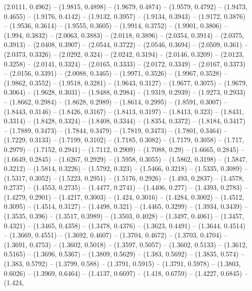 {  (2.0111, 0.4962) -- (1.9815, 0.4898) -- (1.9679, 0.4874) -- (1.9579, 0.4792) 
  -- (1.9473, 0.4655) -- (1.9176, 0.4142) -- (1.9132, 0.3957) -- (1.9134, 
  0.3943) -- (1.9172, 0.3876) -- (1.9536, 0.3614) -- (1.9555, 0.3605) -- 
  (1.9914, 0.3752) -- (1.9901, 0.3806) -- (1.994, 0.3832) -- (2.0063, 0.3883) --
   (2.0118, 0.3896) -- (2.0354, 0.3914) -- (2.0375, 0.3913) -- (2.0408, 0.3907) 
  -- (2.0544, 0.3722) -- (2.0546, 0.3694) -- (2.0509, 0.361) -- (2.0373, 0.3326)
   -- (2.0292, 0.324) -- (2.0242, 0.3194) -- (2.0146, 0.3209) -- (2.0123, 
  0.3258) -- (2.0141, 0.3324) -- (2.0165, 0.3333) -- (2.0172, 0.3349) -- 
  (2.0167, 0.3373) -- (2.0156, 0.3391) -- (2.0088, 0.3465) -- (1.9971, 0.3526) 
  -- (1.9967, 0.3528) -- (1.9862, 0.3552) -- (1.9518, 0.3281) -- (1.9643, 
  0.3127) -- (1.9677, 0.3075) -- (1.9679, 0.3064) -- (1.9628, 0.3031) -- 
  (1.9488, 0.2984) -- (1.9319, 0.2939) -- (1.9273, 0.2933) -- (1.8662, 0.2984) 
  -- (1.8628, 0.2989) -- (1.8614, 0.2995) -- (1.8591, 0.3007) -- (1.8443, 
  0.3146) -- (1.8426, 0.3167) -- (1.8413, 0.3197) -- (1.8413, 0.323) -- (1.8431,
   0.3314) -- (1.8428, 0.3324) -- (1.8408, 0.3344) -- (1.8354, 0.3372) -- 
  (1.8184, 0.3417) -- (1.7889, 0.3473) -- (1.7844, 0.3479) -- (1.7819, 0.3473) 
  -- (1.7801, 0.3464) -- (1.7229, 0.3133) -- (1.7199, 0.3102) -- (1.7185, 
  0.3082) -- (1.7179, 0.3058) -- (1.717, 0.2979) -- (1.7152, 0.2941) -- (1.7112,
   0.2909) -- (1.7088, 0.29) -- (1.6665, 0.2845) -- (1.6649, 0.2845) -- (1.6267,
   0.2929) -- (1.5958, 0.3055) -- (1.5862, 0.3198) -- (1.5847, 0.3212) -- 
  (1.5814, 0.3226) -- (1.5792, 0.323) -- (1.5466, 0.3218) -- (1.5335, 0.3089) --
   (1.5317, 0.3052) -- (1.5223, 0.2951) -- (1.5176, 0.2926) -- (1.493, 0.2837) 
  -- (1.4578, 0.2737) -- (1.4553, 0.2735) -- (1.4477, 0.2741) -- (1.4406, 0.277)
   -- (1.4393, 0.2783) -- (1.4279, 0.2901) -- (1.4217, 0.3003) -- (1.424, 
  0.3016) -- (1.4284, 0.3002) -- (1.4512, 0.3095) -- (1.4514, 0.3127) -- 
  (1.4498, 0.321) -- (1.4465, 0.3299) -- (1.3934, 0.3439) -- (1.3535, 0.396) -- 
  (1.3517, 0.3989) -- (1.3503, 0.4028) -- (1.3497, 0.4061) -- (1.3457, 0.4321) 
  -- (1.3465, 0.4358) -- (1.3478, 0.4376) -- (1.3623, 0.4491) -- (1.3644, 
  0.4514) -- (1.3669, 0.4551) -- (1.3692, 0.4607) -- (1.3704, 0.4672) -- 
  (1.3703, 0.4704) -- (1.3691, 0.4753) -- (1.3602, 0.5018) -- (1.3597, 0.5057) 
  -- (1.3602, 0.5133) -- (1.3612, 0.5165) -- (1.3696, 0.5367) -- (1.3809, 
  0.5629) -- (1.383, 0.5692) -- (1.3835, 0.574) -- (1.383, 0.5792) -- (1.3799, 
  0.588) -- (1.3791, 0.5915) -- (1.3791, 0.5978) -- (1.3803, 0.6026) -- (1.3969,
   0.6464) -- (1.4137, 0.6697) -- (1.418, 0.6759) -- (1.4227, 0.6845) -- (1.424,
}
